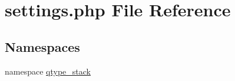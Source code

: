 \hypertarget{settings_8php}{
\section{settings.php File Reference}
\label{settings_8php}
}
\subsection*{Namespaces}
\begin{DoxyCompactItemize}
\item 
namespace \hyperlink{namespaceqtype__stack}{qtype\_\-stack}
\end{DoxyCompactItemize}
